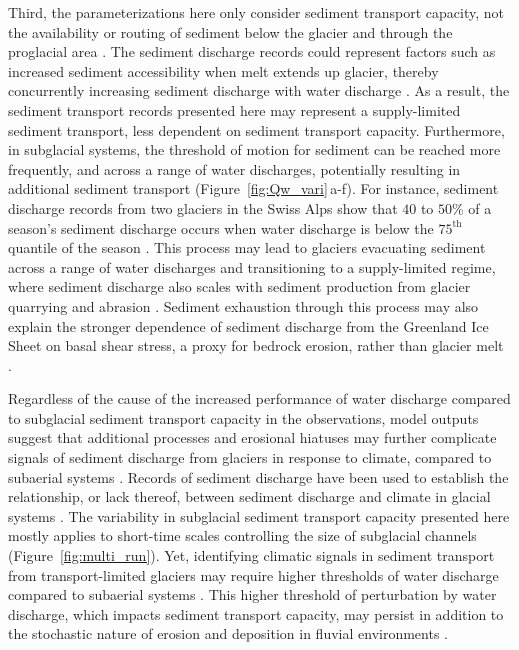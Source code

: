 \documentclass[11pt]{article}
\begin{document}
Third, the parameterizations here only consider sediment transport capacity, not the availability or routing of sediment below the glacier and through the proglacial area \citep{delaney2023}.
The sediment discharge records could represent factors such as increased sediment accessibility when melt extends up glacier, thereby concurrently increasing sediment discharge with water discharge \citep[e.g.][]{delaney2020}.
As a result, the sediment transport records presented here may represent a supply-limited sediment transport, less dependent on sediment transport capacity.
Furthermore, in subglacial systems, the threshold of motion for sediment can be reached more frequently, and across a range of water discharges, potentially resulting in additional sediment transport (Figure~\ref{fig:Qw_vari}\,a-f).
For instance, sediment discharge records from two glaciers in the Swiss Alps show that $40$ to $50$\% of a season's sediment discharge occurs when water discharge is below the $75^{\mathrm{th}}$ quantile of the season \citep{delaney2018}.
This process may lead to glaciers evacuating sediment across a range of water discharges and transitioning to a supply-limited regime, where sediment discharge also scales with sediment production from glacier quarrying and abrasion \citep[e.g.][]{herman2015,ugelvig2018}.
Sediment exhaustion through this process may also explain the stronger dependence of sediment discharge from the Greenland Ice Sheet on basal shear stress, a proxy for bedrock erosion, rather than glacier melt \citep{overeem2017}.

Regardless of the cause of the increased performance of water discharge compared to subglacial sediment transport capacity in the observations, model outputs suggest that additional processes and erosional hiatuses may further complicate signals of sediment discharge from glaciers in response to climate, compared to subaerial systems \citep{jansson2005,ganti2016}.
Records of sediment discharge have been used to establish the relationship, or lack thereof, between sediment discharge and climate in glacial systems \citep[e.g.][]{koppes2009a,willenbring2016,mariotti2021}.
The variability in subglacial sediment transport capacity presented here mostly applies to short-time scales controlling the size of subglacial channels (Figure~\ref{fig:multi_run}).
Yet, identifying climatic signals in sediment transport from transport-limited glaciers may require higher thresholds of water discharge compared to subaerial systems \citep[Figure~\ref{fig:Qw_vari}][]{tofelde2021}.
This higher threshold of perturbation by water discharge, which impacts sediment transport capacity, may persist in addition to the stochastic nature of erosion and deposition in fluvial environments \citep{castletort2003,jerolmack2010,romans2016}.
\end{document}
